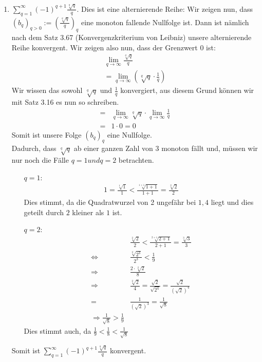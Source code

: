 \begin{lsg}
\begin{enumerate}[label=$\mathrm{(\roman*)}$, ref=$\mathrm{\roman*}$]
\item $\sum^{\infty}_{q=1}(-1)^{q+1}\frac{\sqrt[q]{q}}{q}$. Dies ist eine alternierende Reihe: Wir zeigen nun, dass $(b_q)_{q > 0}:=\left(\frac{\sqrt[q]{q}}{q}\right)_q$ eine monoton fallende Nullfolge ist. Dann ist nämlich nach dem Satz 3.67 (Konvergenzkriterium von Leibniz) unsere alternierende Reihe konvergent. Wir zeigen also nun, dass der Grenzwert $0$ ist:
\begin{align*}
\lim_{q \to \infty}\frac{\sqrt[q]{q}}{q} \\
= \lim_{q \to \infty}\left(\sqrt[q]{q}\cdot \frac{1}{q}\right)
\end{align*}
Wir wissen das sowohl $\sqrt[q]{q}$ und $\frac{1}{q}$ konvergiert, aus diesem Grund können wir mit Satz 3.16 es nun so schreiben.
\begin{align*}
= &\lim_{q \to \infty}\sqrt[q]{q}\cdot \lim_{q \to \infty}\frac{1}{q} \\
= &1 \cdot 0 = 0
\end{align*}
Somit ist unsere Folge $(b_q)_q$ eine Nullfolge. \\
Dadurch, dass $\sqrt[q]{q}$ ab einer ganzen Zahl von $3$ monoton fällt und, müssen wir nur noch die Fälle $q=1 und q=2$ betrachten.
\begin{itemize}
\item[$q=1$:]\begin{align*}
1 = \frac{\sqrt[1]{1}}{1} < \frac{\sqrt[1+1]{1+1}}{1+1} = \frac{\sqrt[2]{2}}{2}
\end{align*}
Dies stimmt, da die Quadratwurzel von 2 ungefähr bei $1,4$ liegt und dies geteilt durch $2$ kleiner als $1$ ist.
\item[$q=2$:]\begin{align*}
&\frac{\sqrt[2]{2}}{2} < \frac{\sqrt[2+1]{2+1}}{2+1} = \frac{\sqrt[3]{3}}{3} \\
\Leftrightarrow &\frac{\sqrt[2]{2^3}}{2^3} < \frac{1}{9} \\
\Rightarrow &\frac{2 \cdot \sqrt[2]{2}}{8} \\
\Rightarrow &\frac{\sqrt[2]{2}}{4} = \frac{\sqrt{2}}{\sqrt{2^4}} = \frac{\sqrt{2}}{(\sqrt{2})^4} \\
= &\frac{1}{(\sqrt{2})^3} = \frac{1}{\sqrt{8}} \\
\Rightarrow \frac{1}{\sqrt{8}} > \frac{1}{9}
\end{align*}
Dies stimmt auch, da $\frac{1}{9} < \frac{1}{8} < \frac{1}{\sqrt{8}}$
\end{itemize}
Somit ist $\sum^{\infty}_{q=1}(-1)^{q+1}\frac{\sqrt[q]{q}}{q}$ konvergent.


\end{enumerate}
\end{lsg}
